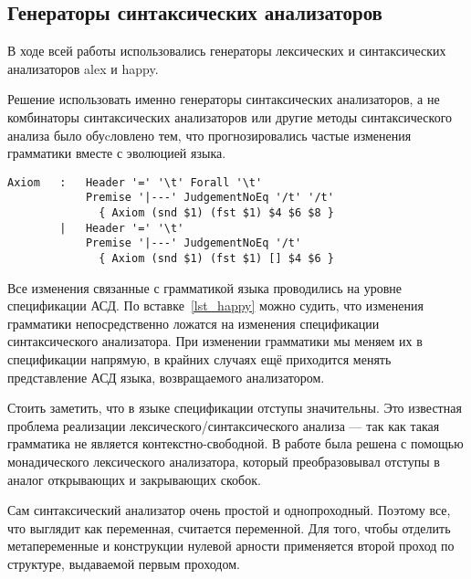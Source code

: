 \subsection{Генераторы синтаксических анализаторов} \label{pars_generators}
В ходе всей работы использовались генераторы лексических и синтаксических анализаторов alex\cite{alex} и happy\cite{happy}.

Решение использовать именно генераторы синтаксических анализаторов, а не комбинаторы синтаксических анализаторов\cite{parsec} или другие методы синтаксического анализа было обуcловлено тем, что прогнозировались частые изменения грамматики вместе с эволюцией языка.

\begin{lstlisting}[caption={Часть спецификации синтаксического анализатора},captionpos=b, frame=single, label={lst_happy}]
Axiom   :   Header '=' '\t' Forall '\t'
            Premise '|---' JudgementNoEq '/t' '/t'
              { Axiom (snd $1) (fst $1) $4 $6 $8 }
        |   Header '=' '\t'
            Premise '|---' JudgementNoEq '/t'
              { Axiom (snd $1) (fst $1) [] $4 $6 }
\end{lstlisting}

Все изменения связанные с грамматикой языка проводились на уровне спецификации АСД. По вставке~\ref{lst_happy} можно судить, что изменения грамматики непосредственно ложатся на изменения спецификации синтаксического анализатора. При изменении грамматики мы меняем их в спецификации напрямую, в крайних случаях ещё приходится менять представление АСД языка, возвращаемого анализатором.

\hfill

Стоить заметить, что в языке спецификации отступы значительны. Это известная проблема реализации лексического/синтаксического анализа --- так как такая грамматика не является контекстно-свободной. В работе была решена с помощью монадического лексического анализатора, который преобразовывал отступы в аналог открывающих и закрывающих скобок.

Сам синтаксический анализатор очень простой и однопроходный. Поэтому все, что выглядит как переменная, считается переменной. Для того, чтобы отделить метапеременные и конструкции нулевой арности применяется второй проход по структуре, выдаваемой первым проходом.

